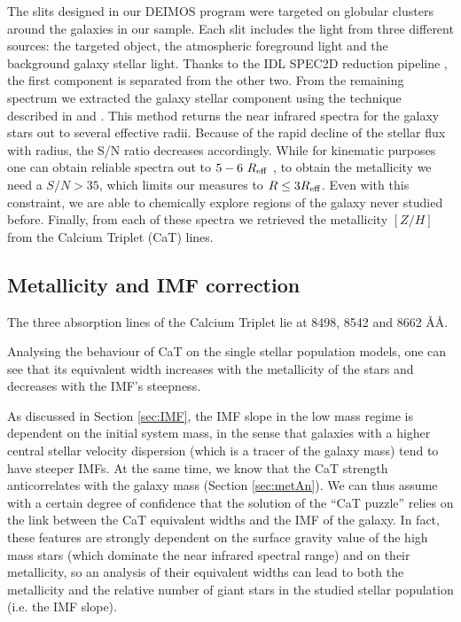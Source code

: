         The slits designed in our DEIMOS program were targeted on globular clusters around the galaxies in our sample. 
        Each slit includes the light from three different sources: the targeted object, the atmospheric foreground light 
        and the background galaxy stellar light. 
        Thanks to the IDL SPEC2D reduction pipeline \citep{Cooper12, Newman12}, the first component is separated 
        from the other two. 
        From the remaining spectrum we extracted the galaxy stellar component using the technique described in  
        \citet{Proctor09} and \citet{Foster09}. 
        This method returns the near infrared spectra for the galaxy stars out to several effective radii. 
        Because of the rapid decline of the stellar flux with radius, the S/N ratio decreases accordingly. 
        While for kinematic purposes one can obtain reliable spectra out to $5-6~R_{\rm{eff}}$ \citep{Arnold13}, to 
        obtain the metallicity we need a $S/N > 35$, which limits our measures to $R \leq 3R_{\rm{eff}}$. 
        Even with this constraint, we are able to chemically explore regions of the galaxy never studied 
        before. 
        Finally, from each of these spectra we retrieved the metallicity $[Z/H]$ from the Calcium Triplet (CaT) lines.

	

	\subsection{Metallicity and IMF correction}


	The three absorption lines of the Calcium Triplet lie at 8498, 8542 and 8662 \AA\AA.
    
   	Analysing the behaviour of CaT on the \citet{Vazdekis10} single stellar population models, one can see that its equivalent 
   	width increases with the metallicity of the stars and decreases with the IMF's steepness.
   	 
	As discussed in Section \ref{sec:IMF}, the IMF slope in the low mass regime is 
	dependent on the initial system mass, in the sense that galaxies with a higher 
	central stellar velocity dispersion (which is a tracer of the galaxy mass) 
	tend to have steeper IMFs. 
	At the same time, we know that the CaT strength anticorrelates with the galaxy mass (Section \ref{sec:metAn}).	
	We can thus assume with a certain degree of confidence that the solution of the ``CaT puzzle'' relies on 
	the link between the CaT equivalent widths and the IMF of the galaxy. 
	In fact, these features are strongly dependent on the surface gravity value of the high mass 
	stars (which dominate the near infrared spectral range) and on their metallicity, 
	so an analysis of their equivalent widths can lead 
	to both the metallicity and the relative number of giant stars in the studied stellar population 
	(i.e. the IMF slope). 
		
